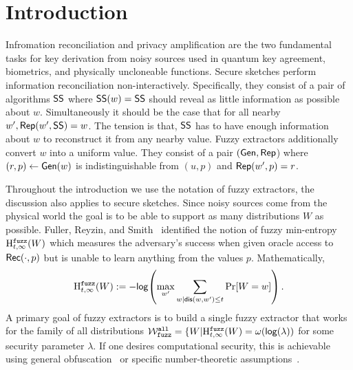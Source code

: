 
\section{Introduction}
Infromation reconciliation and privacy amplification are the two fundamental tasks for key derivation from noisy sources used in quantum key agreement, biometrics, and physically uncloneable functions. Secure sketches perform information reconciliation non-interactively.  Specifically, they consist of a pair of algorithms ${\mathsf{SS}}$ where ${\mathsf{SS}}(w) = {\mathsf{SS}}$ should reveal as little information as possible about $w$.  Simultaneously it should be the case that for all nearby $w', {\mathsf{Rep}}(w', {\mathsf{SS}}) = w$.  The tension is that, ${\mathsf{SS}}$ has to have enough information about $w$ to reconstruct it from any nearby value.  Fuzzy extractors additionally convert $w$ into a uniform value.  They consist of a pair $({\mathsf{Gen}}, {\mathsf{Rep}}$) where $(r, p)\leftarrow {\ensuremath{\mathsf{Gen}}}(w)$ is indistinguishable from $(u, p)$ and ${\mathsf{Rep}}(w', p) =r$.

Throughout the introduction we use the notation of fuzzy extractors, the discussion also applies to secure sketches. 
Since noisy sources come from the physical world the goal is to be able to support as many distributions $W$ as possible.  Fuller, Reyzin, and Smith~\cite{fuller2016fuzzy,fuller2020fuzzy} identified the notion of fuzzy min-entropy $\mathrm{H}^{\mathtt{fuzz}}_{t,\infty}(W)$ which measures the adversary's success when given oracle access to ${\mathsf{Rec}}(\cdot, p)$ but is unable to learn anything from the values  $p$.  Mathematically,
\[
\mathrm{H}^{\mathtt{fuzz}}_{t,\infty}(W):= -\mathsf{log}\!\left(\max_{w'} \sum_{w | \mathsf{dis}(w, w')\le t} \Pr[W=w]\right).
\]A primary goal of fuzzy extractors is to build a single fuzzy extractor that works for the family of all distributions $\mathcal{W}_{\mathtt{fuzz}}^{\mathtt{all}} = \{ W | \mathrm{H}^{\mathtt{fuzz}}_{t,\infty}(W) = \omega(\mathsf{log}\!\left(\lambda\right))$ for some security parameter $\lambda$.  If one desires computational security, this is achievable using general obfuscation~\cite{BitanskyCKP14,bitansky2017virtual} or specific number-theoretic assumptions~\cite{galbraith2019obfuscated}. 

